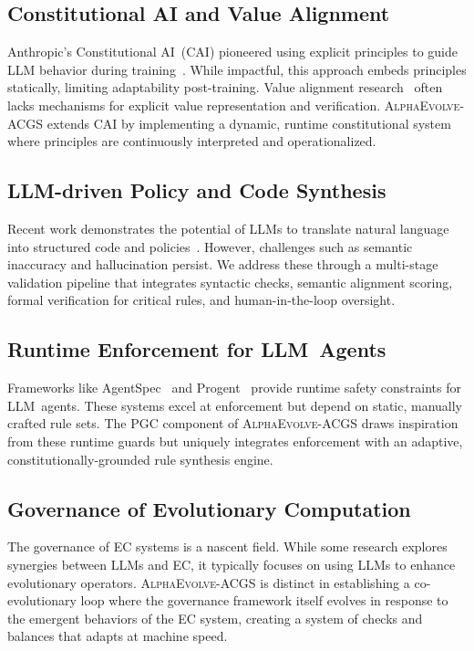 \documentclass[10pt,twocolumn]{article}
\newcommand{\acgs}{\textsc{AlphaEvolve-ACGS}}
\theoremstyle{definition}
\begin{document}
\subsection{Constitutional AI and Value Alignment}
Anthropic's Constitutional AI~(CAI) pioneered using explicit principles to guide LLM behavior during training~\cite{anthropic2022constitutional}. While impactful, this approach embeds principles statically, limiting adaptability post-training. Value alignment research~\cite{russell2019human} often lacks mechanisms for explicit value representation and verification. \acgs{} extends CAI by implementing a dynamic, runtime constitutional system where principles are continuously interpreted and operationalized.

\subsection{LLM-driven Policy and Code Synthesis}
Recent work demonstrates the potential of LLMs to translate natural language into structured code and policies~\cite{propertygpt2023, veriplan2023}. However, challenges such as semantic inaccuracy and hallucination persist. We address these through a multi-stage validation pipeline that integrates syntactic checks, semantic alignment scoring, formal verification for critical rules, and human-in-the-loop oversight.

\subsection{Runtime Enforcement for LLM~Agents}
Frameworks like AgentSpec~\cite{agentspec2023} and Progent~\cite{progent2023} provide runtime safety constraints for LLM~agents. These systems excel at enforcement but depend on static, manually crafted rule sets. The PGC component of \acgs{} draws inspiration from these runtime guards but uniquely integrates enforcement with an adaptive, constitutionally-grounded rule synthesis engine.

\subsection{Governance of Evolutionary Computation}
The governance of EC systems is a nascent field. While some research explores synergies between LLMs and EC, it typically focuses on using LLMs to enhance evolutionary operators. \acgs{} is distinct in establishing a co-evolutionary loop where the governance framework itself evolves in response to the emergent behaviors of the EC system, creating a system of checks and balances that adapts at machine speed.
\end{document}
